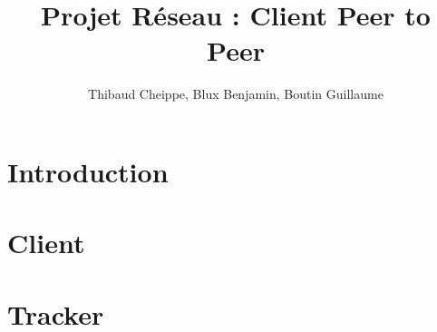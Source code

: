 \documentclass[a4paper,11pt]{report}
\title{Projet Réseau : Client Peer to Peer}
\author{Thibaud Cheippe, Blux Benjamin, Boutin Guillaume}
\begin{document}
\maketitle



\section{Introduction}

\section{Client} 


\section{Tracker}

\end{document}
